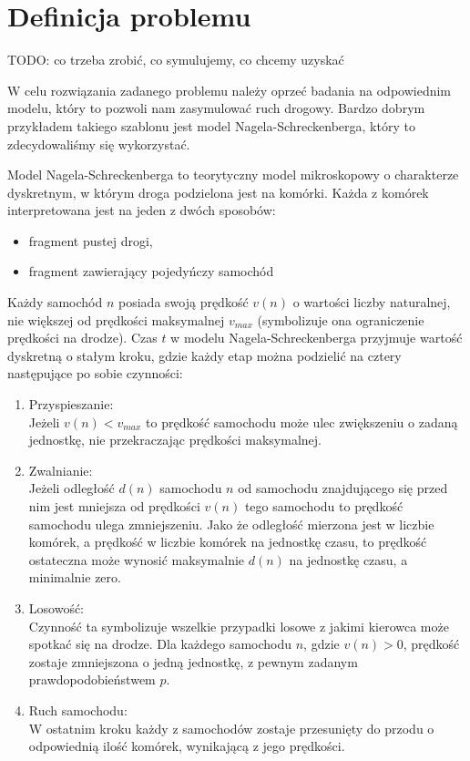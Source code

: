 \documentclass[a4paper,12pt]{article}
\begin{document}
	\section{Definicja problemu}
	TODO: co trzeba zrobić, co symulujemy, co chcemy uzyskać
	
	W celu rozwiązania zadanego problemu należy oprzeć badania na odpowiednim modelu, który to pozwoli nam zasymulować ruch drogowy. Bardzo dobrym przykładem takiego szablonu jest model Nagela-Schreckenberga, który to zdecydowaliśmy się wykorzystać.
	
	Model Nagela-Schreckenberga to teorytyczny model mikroskopowy o charakterze dyskretnym, w którym droga podzielona jest na komórki. Każda z komórek interpretowana jest na jeden z dwóch sposobów:
	\begin{itemize}
		\item fragment pustej drogi,
		\item fragment zawierający pojedyńczy samochód
	\end{itemize}
	Każdy samochód $n$ posiada swoją prędkość $v(n)$ o wartości liczby naturalnej, nie większej od prędkości maksymalnej $v_{max}$ (symbolizuje ona ograniczenie prędkości na drodze).
	Czas $t$ w modelu Nagela-Schreckenberga przyjmuje wartość dyskretną o stałym kroku, gdzie każdy etap można podzielić na cztery następujące po sobie czynności:
	\begin{enumerate}
		\item Przyspieszanie: \\
		Jeżeli $v(n) < v_{max}$ to prędkość samochodu może ulec zwiększeniu o zadaną jednostkę, nie przekraczając prędkości maksymalnej.
		\item Zwalnianie: \\
		Jeżeli odległość $d(n)$ samochodu $n$ od samochodu znajdującego się przed nim jest mniejsza od prędkości $v(n)$ tego samochodu to prędkość samochodu ulega zmniejszeniu. Jako że odległość mierzona jest w liczbie komórek, a prędkość w liczbie komórek na jednostkę czasu, to prędkość ostateczna może wynosić maksymalnie $d(n)$ na jednostkę czasu, a minimalnie zero.
		\item Losowość: \\
		Czynność ta symbolizuje wszelkie przypadki losowe z jakimi kierowca może spotkać się na drodze. Dla każdego samochodu $n$, gdzie $v(n) > 0$, prędkość zostaje zmniejszona o jedną jednostkę, z pewnym zadanym prawdopodobieństwem $p$.
		\item Ruch samochodu: \\
		W ostatnim kroku każdy z samochodów zostaje przesunięty do przodu o odpowiednią ilość komórek, wynikającą z jego prędkości.
	\end{enumerate}
	
\end{document}
